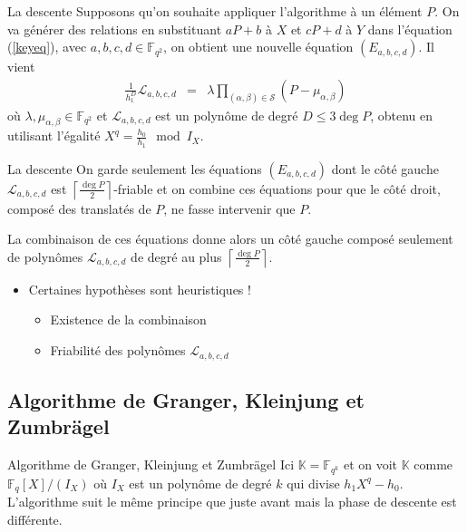 \documentclass[xcolor=x11names,compress]{beamer}
\theoremstyle{break}
\theoremstyle{sc}
\theoremstyle{definition}
\theoremstyle{remark}
\begin{document}
\begin{frame}{La descente}
  Supposons qu'on souhaite appliquer l'algorithme à un élément $P$. On va
  générer des relations en substituant $aP + b$ à $X$ et $cP + d$ à $Y$ dans l'équation
  (\ref{keyeq}), avec $a, b, c, d \in \mathbb{F}_{q^2}$, on obtient une nouvelle
  équation $(E_{a, b, c, d})$. Il vient 
  \begin{eqnarray*}
    \frac{1}{h_1^D}\mathcal L_{a, b, c, d} &=& \lambda \prod_{(\alpha, \beta)\in\mathcal S}(P-\mu_{\alpha, \beta})
  \end{eqnarray*}
  où $\lambda, \mu_{\alpha, \beta}\in\mathbb{F}_{q^2}$ et $\mathcal L_{a, b, c,
  d}$ est un polynôme de degré $D\leq 3\deg P$, obtenu en utilisant l'égalité $X^q =
  \frac{h_0}{h_1}\mod I_X$.
  
\end{frame}

\begin{frame}{La descente}
  On garde seulement les équations $(E_{a, b, c, d})$ dont le côté gauche
  $\mathcal L_{a, b, c, d}$ est
  $\left\lceil \frac{\deg P}{2}\right\rceil$-friable et on combine ces équations
  pour que le côté droit, composé des translatés de $P$, ne fasse intervenir que
  $P$.

  La combinaison de ces équations donne alors un côté gauche composé seulement
  de polynômes $\mathcal L_{a, b, c, d}$ de degré au plus $\left\lceil \frac{\deg P}{2}\right\rceil$.
  \begin{itemize}
    \item Certaines hypothèses sont heuristiques !
      \begin{itemize}
        \item Existence de la combinaison
        \item Friabilité des polynômes $\mathcal L_{a, b, c, d}$
      \end{itemize}
  \end{itemize}
\end{frame}


\subsection{Algorithme de Granger, Kleinjung et Zumbrägel}

\begin{frame}{Algorithme de Granger, Kleinjung et Zumbrägel}
  Ici $\mathbb{K}=\mathbb{F}_{q^k}$ et on voit $\mathbb{K}$ comme
  $\mathbb{F}_q[X]/(I_X)$ où $I_X$ est un polynôme de degré $k$ qui divise
  $h_1X^q-h_0$. L'algorithme suit le même principe que juste avant mais la phase
  de descente est différente. 
\end{frame}
\end{document}
